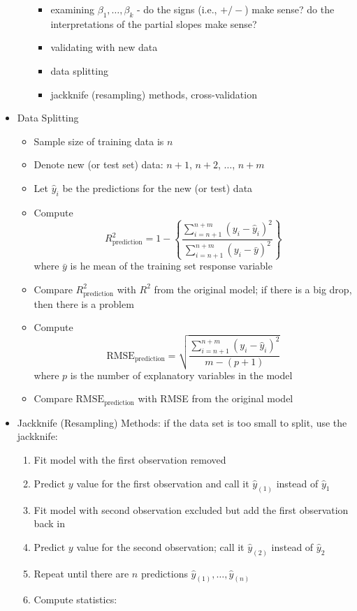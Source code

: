 \documentclass[12pt]{article}
\begin{document}
\begin{itemize}
\begin{itemize}
\begin{itemize}
\item examining $\beta_1,\dots,\beta_k$ - do the signs (i.e., $+/-$) make sense? do the interpretations of the partial slopes make sense? 
\item validating with new data 
\item data splitting 
\item jackknife (resampling) methods, cross-validation \end{itemize} \end{itemize} 
\item Data Splitting \begin{itemize} 
\item Sample size of training data is $n$
\item Denote new (or test set) data: $n+1$, $n+2$, $\dots$, $n+m$
\item Let $\hat{y}_i$ be the predictions for the new (or test) data 
\item Compute $$ R^2_{\text{prediction}} = 1 - \left\{ \frac{\sum_{i=n+1}^{n+m} (y_i - \hat{y}_i)^2}{\sum_{i=n+1}^{n+m} (y_i - \bar{y})^2} \right\} $$ where $\bar{y}$ is he mean of the training set response variable 
\item Compare $R^2_{\text{prediction}}$ with $R^2$ from the original model; if there is a big drop, then there is a problem
\item Compute $$ \text{RMSE}_{\text{prediction}} = \sqrt{\frac{ \sum_{i=n+1}^{n+m} (y_i - \hat{y}_i)^2}{m - (p+1)}} $$ where $p$ is the number of explanatory variables in the model
\item Compare $\text{RMSE}_{\text{prediction}}$ with RMSE from the original model \end{itemize} 
\item Jackknife (Resampling) Methods: if the data set is too small to split, use the jackknife: \begin{enumerate} 
\item Fit model with the first observation removed 
\item Predict $y$ value for the first observation and call it $\hat{y}_{(1)}$ instead of $\hat{y}_1$ 
\item Fit model with second observation excluded but add the first observation back in 
\item Predict $y$ value for the second observation; call it $\hat{y}_{(2)}$ instead of $\hat{y}_2$ 
\item Repeat until there are $n$ predictions $\hat{y}_{(1)},\dots,\hat{y}_{(n)}$
\item Compute statistics: $$ \begin{aligned} 

\end{aligned}$$
\end{enumerate}
\end{itemize}
\end{document}
